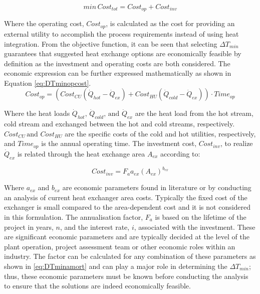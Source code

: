 \begin{equation}\label{eq:DTminobj}
min \, Cost_{tot}= Cost_{op}+Cost_{inv}
\end{equation}

Where the operating cost, $Cost_{op}$, is calculated as the cost for providing an external utility to accomplish the process requirements instead of using heat integration. From the objective function, it can be seen that selecting $\Delta T_{min}$ guarantees that suggested heat exchange options are economically feasible by definition as the investment and operating costs are both considered. The economic expression can be further expressed mathematically as shown in Equation \ref{eq:DTminopcost}.
\begin{equation}\label{eq:DTminopcost}
Cost_{op}=\left(Cost_{CU} (\dot Q_{hot}-\dot Q_{ex})+ Cost_{HU} (\dot Q_{cold}-\dot Q_{ex})\right) \cdot Time_{op}
\end{equation}

Where the heat loads $\dot Q_{hot},\, \dot Q_{cold}, \, \text{and }\dot Q_{ex}$ are the heat load from the hot stream, cold stream and exchanged between the hot and cold streams, respectively. $Cost_{CU} \, \text{and } Cost_{HU}$ are the specific costs of the cold and hot utilities, respectively, and $Time_{op}$ is the annual operating time. The investment cost, $Cost_{inv}$, to realize $\dot Q_{ex}$ is related through the heat exchange area $A_{ex}$ according to:

\begin{equation}\label{eq:DTmininvcost}
Cost_{inv}=F_a a_{ex}(A_{ex})^{b_{ex}}
\end{equation}

Where $a_{ex}$ and $b_{ex}$ are economic parameters found in literature or by conducting an analysis of current heat exchanger area costs. Typically the fixed cost of the exchanger is small compared to the area-dependent cost and it is not considered in this formulation. The annualisation factor, $F_a$ is based on the lifetime of the project in years, $n$, and the interest rate, $i$, associated with the investment. These are significant economic parameters and are typically decided at the level of the plant operation, project assessment team or other economic roles within an industry. The factor can be calculated for any combination of these parameters as shown in \ref{eq:DTminamort} and can play a major role in determining the $\Delta T_{min}$; thus, these economic parameters must be known before conducting the analysis to ensure that the solutions are indeed economically feasible.

